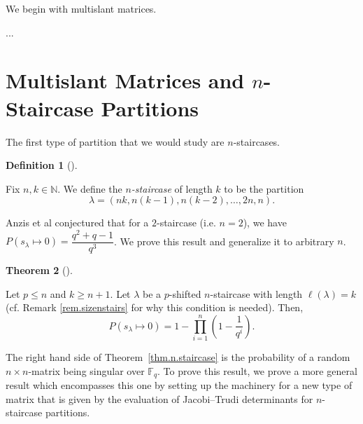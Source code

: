 \documentclass[numbers=enddot,12pt,final,onecolumn,notitlepage]{scrartcl}%
\theoremstyle{definition}
\newtheorem{theo}{Theorem}[section]
\newenvironment{theorem}[1][]
{\begin{theo}[#1]\begin{leftbar}}
{\end{leftbar}\end{theo}}
\newtheorem{defi}[theo]{Definition}
\newenvironment{definition}[1][]
{\begin{defi}[#1]\begin{leftbar}}
{\end{leftbar}\end{defi}}
\let\prodnonlimits\prod
\renewcommand{\prod}{\prodnonlimits\limits}
\newcommand{\NN}{\mathbb{N}}
\renewcommand{\leq}{\leqslant}
\renewcommand{\geq}{\geqslant}
\theoremstyle{plainsl}
\begin{document}
We begin with multislant matrices.

...



\section{Multislant Matrices and $n$-Staircase Partitions}
The first type of partition that we would study are $n$-staircases. 

\begin{definition}
\label{nstaircasedef}
Fix $n,k \in \NN$.
We define the \emph{$n$-staircase} of length $k$ to be the partition
\[
\lambda = (nk, n(k-1), n(k-2), \ldots,2n, n) .
\]

\end{definition}
Anzis et al \cite{Anzis18} conjectured that for a $2$-staircase (i.e. $n=2$), we have $P(s_{\lambda} \longmapsto 0) = \dfrac{q^2+q -1}{q^3}$. We prove this result and generalize it to arbitrary $n$.

\begin{theorem}
\label{thm.n.staircase}
Let $p \leq n$ and $k \geq n+1$.
Let $\lambda$ be a $p$-shifted $n$-staircase with
length $\ell(\lambda) = k$
(cf. Remark \ref{rem.sizenstairs} for why this condition is needed). Then,
\[
P(s_{\lambda} \longmapsto 0) = 1- \prod_{i=1}^{n} \left(  1-\dfrac{1}{q^{i}}\right) .
\]
\end{theorem}

The right hand side of Theorem~\ref{thm.n.staircase}
is the probability of a random $n\times n$-matrix being singular over $\mathbb{F}_q$. To prove this result, we prove a more general result which encompasses this one by setting up the machinery for a new type of matrix that is given by the evaluation of Jacobi--Trudi determinants for $n$-staircase partitions.
\end{document}
